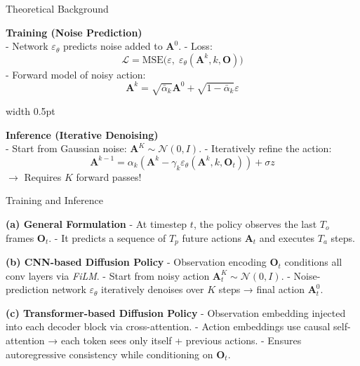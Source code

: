 \documentclass[final]{beamer}
\newlength{\colwidth}
\begin{document}
\begin{frame}[t]
\begin{columns}[t]
\begin{column}{\colwidth}
\begin{block}{Theoretical Background}
\begin{minipage}[t]{0.48\linewidth}
    \textbf{Training (Noise Prediction)}\\[0.3em]
    - Network $\varepsilon_\theta$ predicts noise added to $\mathbf{A}^0$.  
    - Loss:
    \[
    \mathcal{L} = \text{MSE}\Big( \varepsilon, \; \varepsilon_\theta(\mathbf{A}^k, k, \mathbf{O}) \Big)
    \]  
    - Forward model of noisy action:
    \[
    \mathbf{A}^k = \sqrt{\bar{\alpha}_k}\mathbf{A}^0 + \sqrt{1-\bar{\alpha}_k}\varepsilon
    \]  
\end{minipage}%
\hfill
\vrule width 0.5pt %
\hfill
\begin{minipage}[t]{0.48\linewidth}
    \textbf{Inference (Iterative Denoising)}\\[0.3em]
    - Start from Gaussian noise: $\mathbf{A}^K \sim \mathcal{N}(0, I)$.
    - Iteratively refine the action:
    \[
    \mathbf{A}^{k-1} = \alpha_k (\mathbf{A}^k - \gamma_k \varepsilon_\theta(\mathbf{A}^k, k, \mathbf{O}_t)) + \sigma z
    \]
    \textcolor{myDarkRed}{$\rightarrow$ Requires $K$ forward passes!}
\end{minipage}

\end{block}

\vspace{-0.5cm}

\begin{block}{Training and Inference}

\textbf{(a) General Formulation}
- At timestep \( t \), the policy observes the last \( T_o \) frames \( \mathbf{O}_t \).
- It predicts a sequence of \( T_p \) future actions \( \mathbf{A}_t \) and executes \( T_a \) steps.

\vspace{0.3em}

\textbf{(b) CNN-based Diffusion Policy}  
- Observation encoding \( \mathbf{O}_t \) conditions all conv layers via \emph{FiLM}.  
- Start from noisy action \( \mathbf{A}^K_t \sim \mathcal{N}(0,I) \).  
- Noise-prediction network \( \varepsilon_\theta \) iteratively denoises over \( K \) steps → final action \( \mathbf{A}^0_t \).

\vspace{0.3em}

\textbf{(c) Transformer-based Diffusion Policy}  
- Observation embedding injected into each decoder block via cross-attention.  
- Action embeddings use causal self-attention → each token sees only itself + previous actions.  
- Ensures autoregressive consistency while conditioning on \( \mathbf{O}_t \).


\end{block}
\end{column}
\end{columns}
\end{frame}
\end{document}

